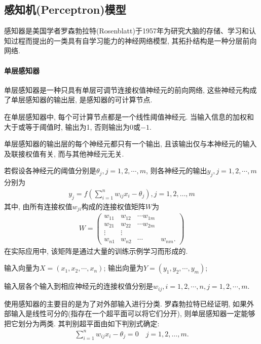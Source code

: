 \subsection{感知机(Perceptron)模型}
感知器是美国学者罗森勃拉特(Rosenblatt)于1957年为研究大脑的存储、学习和认知过程而提出的一类具有自学习能力的神经网络模型, 其拓扑结构是一种分层前向网络.
\paragraph{单层感知器}
单层感知器是一种只具有单层可调节连接权值神经元的前向网络, 这些神经元构成了单层感知器的输出层, 是感知器的可计算节点.

在单层感知器中, 每个可计算节点都是一个线性阈值神经元. 当输入信息的加权和大于或等于阈值时, 输出为1, 否则输出为0或$-1$.

单层感知器的输出层的每个神经元都只有一个输出, 且该输出仅与本神经元的输入及联接权值有关, 而与其他神经元无关.

若假设各神经元的阈值分别是$\theta_j, j=1,2,\cdots,m$, 则各神经元的输出$y_j, j=1,2,\cdots,m$分别为
\begin{align}
  {y}_{{j}}={f}\left(\sum_{{i}=1}^{{n}} w_{{ij}} {x}_{{i}}-\theta_{{j}}\right), {j}=1,2, \ldots, {m}
\end{align}
其中, 由所有连接权值$w_{ji}$构成的连接权值矩阵$W$为
\begin{align}
W=\left(
\begin{array}{llll}
{w_{11}} & {w_{12}} & {\cdots w_{1 {m}}} \\
{w_{21}} & {w_{22}} & {\cdots w_{2 {m}}} \\
{\vdots} & {\vdots} & {} \\
{w_{{n} 1}} & {w_{{n} 2}} & {\cdots} & {w_{{nm}}}.
\end{array}
\right)
\end{align}
在实际应用中, 该矩阵是通过大量的训练示例学习而形成的.

输入向量为$X=(x_1,x_2,\cdots,x_n)$; 输出向量为$Y=(y_1,y_2,\cdots,y_m)$;

输入层各个输入到相应神经元的连接权值分别是$w_{ij},i=1,2,\cdots,n, j=1,2,\cdots, m$.

使用感知器的主要目的是为了对外部输入进行分类. 罗森勃拉特已经证明, 如果外部输入是线性可分的(指存在一个超平面可以将它们分开), 则单层感知器一定能够把它划分为两类. 其判别超平面由如下判别式确定:
\begin{align}
  \sum_{i=1}^{n} w_{i j} x_{i}-\theta_{j}=0 \quad j=1,2, \ldots, m.
\end{align}

